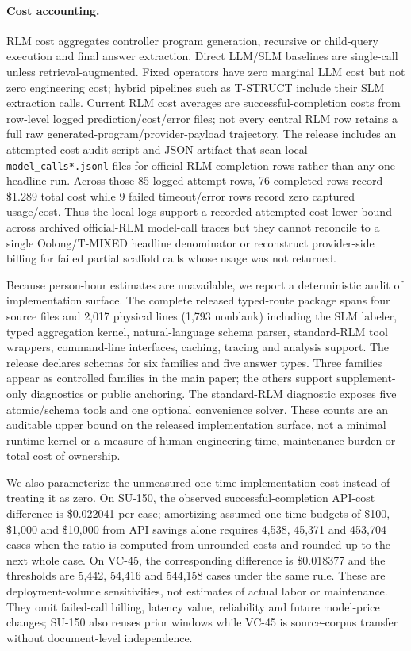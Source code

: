 \documentclass[letterpaper]{article}
\begin{document}
\paragraph{Cost accounting.}
RLM cost aggregates controller program generation, recursive or child-query execution and final answer extraction. Direct LLM/SLM baselines are single-call unless retrieval-augmented. Fixed operators have zero marginal LLM cost but not zero engineering cost; hybrid pipelines such as T-STRUCT include their SLM extraction calls. Current RLM cost averages are successful-completion costs from row-level logged prediction/cost/error files; not every central RLM row retains a full raw generated-program/provider-payload trajectory. The release includes an attempted-cost audit script and JSON artifact that scan local \texttt{model\_calls*.jsonl} files for official-RLM completion rows rather than any one headline run. Across those 85 logged attempt rows, 76 completed rows record \$1.289 total cost while 9 failed timeout/error rows record zero captured usage/cost. Thus the local logs support a recorded attempted-cost lower bound across archived official-RLM model-call traces but they cannot reconcile to a single Oolong/T-MIXED headline denominator or reconstruct provider-side billing for failed partial scaffold calls whose usage was not returned.

Because person-hour estimates are unavailable, we report a deterministic audit of implementation surface. The complete released typed-route package spans four source files and 2,017 physical lines (1,793 nonblank) including the SLM labeler, typed aggregation kernel, natural-language schema parser, standard-RLM tool wrappers, command-line interfaces, caching, tracing and analysis support. The release declares schemas for six families and five answer types. Three families appear as controlled families in the main paper; the others support supplement-only diagnostics or public anchoring. The standard-RLM diagnostic exposes five atomic/schema tools and one optional convenience solver. These counts are an auditable upper bound on the released implementation surface, not a minimal runtime kernel or a measure of human engineering time, maintenance burden or total cost of ownership.

We also parameterize the unmeasured one-time implementation cost instead of treating it as zero. On SU-150, the observed successful-completion API-cost difference is \$0.022041 per case; amortizing assumed one-time budgets of \$100, \$1,000 and \$10,000 from API savings alone requires 4,538, 45,371 and 453,704 cases when the ratio is computed from unrounded costs and rounded up to the next whole case. On VC-45, the corresponding difference is \$0.018377 and the thresholds are 5,442, 54,416 and 544,158 cases under the same rule. These are deployment-volume sensitivities, not estimates of actual labor or maintenance. They omit failed-call billing, latency value, reliability and future model-price changes; SU-150 also reuses prior windows while VC-45 is source-corpus transfer without document-level independence.
\end{document}
